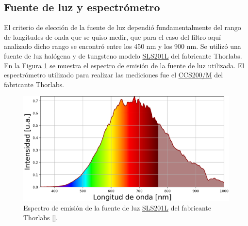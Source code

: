 
\singlespacing
\subsection{Fuente de luz y espectrómetro \href{https://github.com/jrr1984/defects_analysis/blob/master/light_sources_spectrum.py}{\faGithub}}
\label{sec:fteluzyesp}

\hspace{0.5cm}El criterio de elección de la fuente de luz dependió fundamentalmente del rango de longitudes de onda que se quiso medir, que para el caso del filtro aquí analizado dicho rango se encontró entre los 450 nm y los 900 nm.
Se utilizó una fuente de luz halógena y de tungsteno modelo \href{https://www.thorlabs.com/newgrouppage9.cfm?objectgroup_id=7269&pn=SLS201L/M}{SLS201L} del fabricante Thorlabs. En la Figura \ref{fig:espfth} se muestra el espectro de emisión de la fuente de luz utilizada.  El espectrómetro utilizado para realizar las mediciones fue el \href{https://www.thorlabs.com/thorproduct.cfm?partnumber=CCS200/M#ad-image-0}{CCS200/M} del fabricante Thorlabs.

\begin{figure}[H]
	\centering
	\includegraphics[width=1.0\textwidth]{Figs/microespectrometro/espfuentethorl.png}
	\caption{Espectro de emisión de la fuente de luz \href{https://www.thorlabs.com/newgrouppage9.cfm?objectgroup\_id=7269&pn=SLS201L/M}{SLS201L} del fabricante Thorlabs [\href{https://github.com/jrr1984/defects\_analysis/blob/master/light\_sources\_spectrum.py}{\faGithub}].}
	\label{fig:espfth}
\end{figure}

